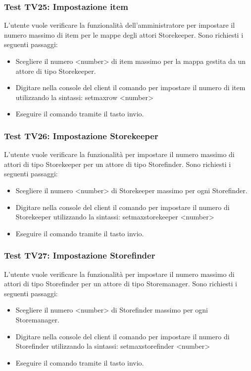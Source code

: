 \documentclass[a4paper]{article}
\begin{document}
		\subsubsection{Test TV25: Impostazione item}
		L'utente vuole verificare la funzionalità dell'amministratore per impostare il numero massimo di item per le mappe degli attori Storekeeper.
		Sono richiesti i seguenti passaggi:
		\begin{itemize}
			\item Scegliere il numero <number> di item massimo per la mappa gestita da un attore di tipo Storekeeper.
			\item Digitare nella console del client il comando per impostare il numero di item utilizzando la sintassi: setmaxrow <number>
			\item Eseguire il comando tramite il tasto invio.
		\end{itemize}
		
		\subsubsection{Test TV26: Impostazione Storekeeper}
		L'utente vuole verificare la funzionalità per impostare il numero massimo di attori di tipo Storekeeper per un attore di tipo Storefinder.
		Sono richiesti i seguenti passaggi:
		\begin{itemize}
			\item Scegliere il numero <number> di Storekeeper massimo per ogni Storefinder.
			\item Digitare nella console del client il comando per impostare il numero di Storekeeper utilizzando la sintassi: setmaxstorekeeper <number>
			\item Eseguire il comando tramite il tasto invio.
		\end{itemize}
		
		\subsubsection{Test TV27: Impostazione Storefinder}
		L'utente vuole verificare la funzionalità per impostare il numero massimo di attori di tipo Storefinder per un attore di tipo Storemanager.
		Sono richiesti i seguenti passaggi:
		\begin{itemize}
			\item Scegliere il numero <number> di Storefinder massimo per ogni Storemanager.
			\item Digitare nella console del client il comando per impostare il numero di Storefinder utilizzando la sintassi: setmaxstorefinder <number>
			\item Eseguire il comando tramite il tasto invio.
		\end{itemize}
		
\end{document}
